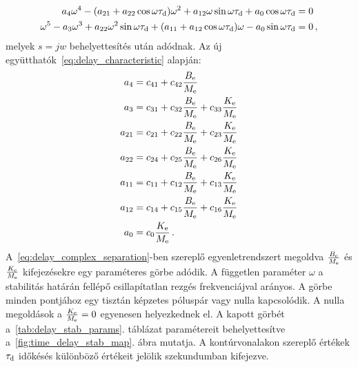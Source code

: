 \begin{align}\label{eq:delay_complex_separation}
    \begin{split}
        a_4\omega^4-(a_{21} + a_{22}\cos{\omega\tau_{\mathrm{d}}})\omega^2+a_{12}\omega\sin{\omega\tau_{\mathrm{d}}} + a_0\cos{\omega\tau_{\mathrm{d}}} &= 0 \\
        \omega^5 -a_3\omega^3 + a_{22}\omega^2\sin{\omega\tau_{\mathrm{d}}} + (a_{11} + a_{12}\cos{\omega\tau_{\mathrm{d}}})\omega - a_0\sin{\omega\tau_{\mathrm{d}}}  &= 0 \,,
    \end{split}
\end{align}
melyek \(s=jw\) behelyettesítés után adódnak. Az új együtthatók~\eqref{eq:delay_characteristic} alapján:
\begin{align}
    \begin{split}
        a_4 &= c_{41} + c_{42}\frac{B_{\mathrm{e}}}{M_{\mathrm{e}}}\\ 
        a_3 &= c_{31} + c_{32}\frac{B_{\mathrm{e}}}{M_{\mathrm{e}}} + c_{33}\frac{K_{\mathrm{e}}}{M_{\mathrm{e}}}\\ 
        a_{21} &= c_{21} + c_{22}\frac{B_{\mathrm{e}}}{M_{\mathrm{e}}} + c_{23}\frac{K_{\mathrm{e}}}{M_{\mathrm{e}}}\\ 
        a_{22} &= c_{24} + c_{25}\frac{B_{\mathrm{e}}}{M_{\mathrm{e}}} + c_{26}\frac{K_{\mathrm{e}}}{M_{\mathrm{e}}}\\ 
        a_{11} &= c_{11} + c_{12}\frac{B_{\mathrm{e}}}{M_{\mathrm{e}}} + c_{13}\frac{K_{\mathrm{e}}}{M_{\mathrm{e}}}\\ 
        a_{12} &= c_{14} + c_{15}\frac{B_{\mathrm{e}}}{M_{\mathrm{e}}} + c_{16}\frac{K_{\mathrm{e}}}{M_{\mathrm{e}}}\\ 
        a_0 &= c_0 \frac{K_{\mathrm{e}}}{M_{\mathrm{e}}}\,.
    \end{split}
\end{align}
A~\eqref{eq:delay_complex_separation}-ben szereplő egyenletrendszert megoldva \(\frac{B_{\mathrm{e}}}{M_{\mathrm{e}}}\)
és \(\frac{K_{\mathrm{e}}}{M_{\mathrm{e}}}\) kifejezésekre egy paraméteres görbe adódik. 
A független paraméter \(\omega\) a stabilitás határán fellépő csillapítatlan rezgés frekvenciájval
arányos. A görbe minden pontjához egy tisztán képzetes póluspár vagy nulla kapcsolódik. 
A nulla megoldások a \(\frac{K_{\mathrm{e}}}{M_{\mathrm{e}}} = 0\) egyenesen helyezkednek el. 
A kapott görbét a~\ref{tab:delay_stab_params}. táblázat paramétereit behelyettesítve 
a~\ref{fig:time_delay_stab_map}. ábra mutatja. A kontúrvonalakon szereplő értékek \(\tau_{\mathrm{d}}\)
időkésés különböző értékeit jelölik szekundumban kifejezve.

